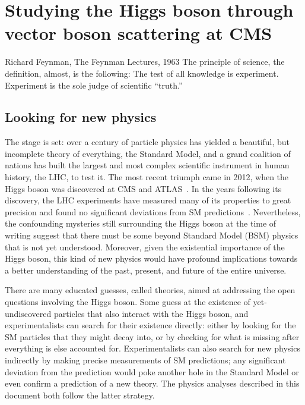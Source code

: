 \chapter{Studying the Higgs boson through vector boson scattering at CMS}
\begin{aquote}{Richard Feynman, The Feynman Lectures, 1963}
The principle of science, the definition, almost, is the following: The test of all knowledge is experiment. 
Experiment is the sole judge of scientific ``truth.''
\end{aquote}

\section{Looking for new physics}
The stage is set: over a century of particle physics has yielded a beautiful, but incomplete theory of everything, the Standard Model, and a grand coalition of nations has built the largest and most complex scientific instrument in human history, the LHC, to test it. 
The most recent triumph came in 2012, when the Higgs boson was discovered at CMS and ATLAS~\cite{CMSdisc, ATLASdisc}. 
In the years following its discovery, the LHC experiments have measured many of its properties to great precision and found no significant deviations from SM predictions~\cite{NatureHiggsCMS2022, NatureHiggsATLAS2022}. 
Nevertheless, the confounding mysteries still surrounding the Higgs boson at the time of writing suggest that there must be some beyond Standard Model (BSM) physics that is not yet understood. 
Moreover, given the existential importance of the Higgs boson, this kind of new physics would have profound implications towards a better understanding of the past, present, and future of the entire universe. 

There are many educated guesses, called theories, aimed at addressing the open questions involving the Higgs boson. 
Some guess at the existence of yet-undiscovered particles that also interact with the Higgs boson\footnotemark{}, and experimentalists can search for their existence directly: either by looking for the SM particles that they might decay into, or by checking for what is missing after everything is else accounted for. 
Experimentalists can also search for new physics indirectly by making precise measurements of SM predictions; any significant deviation from the prediction would poke another hole in the Standard Model or even confirm a prediction of a new theory. 
The physics analyses described in this document both follow the latter strategy.

